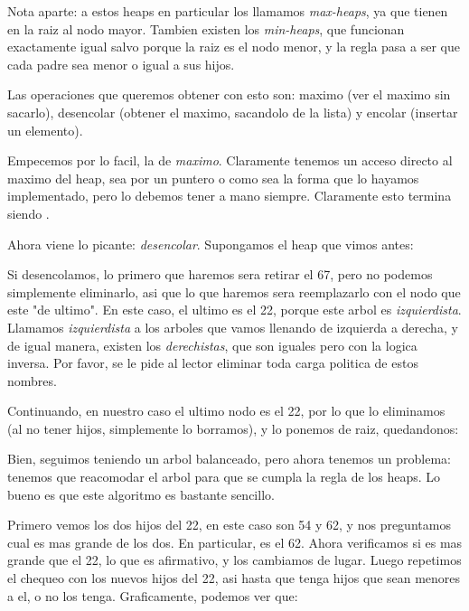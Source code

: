 \documentclass{article}
\begin{document}
Nota aparte: a estos heaps en particular los llamamos \textit{max-heaps}, ya que tienen en la raiz al nodo mayor. Tambien existen los \textit{min-heaps}, que funcionan exactamente igual salvo porque la raiz es el nodo menor, y la regla pasa a ser que cada padre sea menor o igual a sus hijos.

Las operaciones que queremos obtener con esto son: maximo (ver el maximo sin sacarlo), desencolar (obtener el maximo, sacandolo de la lista) y encolar (insertar un elemento).

Empecemos por lo facil, la de \textit{maximo}. Claramente tenemos un acceso directo al maximo del heap, sea por un puntero o como sea la forma que lo hayamos implementado, pero lo debemos tener a mano siempre. Claramente esto termina siendo .

Ahora viene lo picante: \textit{desencolar}. Supongamos el heap que vimos antes:


Si desencolamos, lo primero que haremos sera retirar el 67, pero no podemos simplemente eliminarlo, asi que lo que haremos sera reemplazarlo con el nodo que este "de ultimo". En este caso, el ultimo es el 22, porque este arbol es \textit{izquierdista}. Llamamos \textit{izquierdista} a los arboles que vamos llenando de izquierda a derecha, y de igual manera, existen los \textit{derechistas}, que son iguales pero con la logica inversa. Por favor, se le pide al lector eliminar toda carga politica de estos nombres.

Continuando, en nuestro caso el ultimo nodo es el 22, por lo que lo eliminamos (al no tener hijos, simplemente lo borramos), y lo ponemos de raiz, quedandonos:


Bien, seguimos teniendo un arbol balanceado, pero ahora tenemos un problema: tenemos que reacomodar el arbol para que se cumpla la regla de los heaps. Lo bueno es que este algoritmo es bastante sencillo.

Primero vemos los dos hijos del 22, en este caso son 54 y 62, y nos preguntamos cual es mas grande de los dos. En particular, es el 62. Ahora verificamos si es mas grande que el 22, lo que es afirmativo, y los cambiamos de lugar. Luego repetimos el chequeo con los nuevos hijos del 22, asi hasta que tenga hijos que sean menores a el, o no los tenga. Graficamente, podemos ver que:
\end{document}
